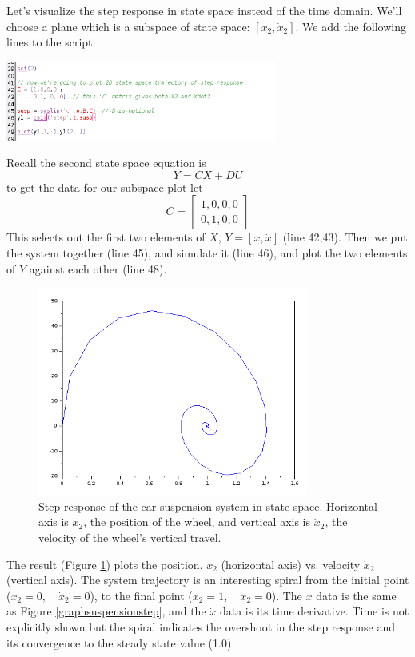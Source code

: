 Let's visualize the step response in state space instead of the time domain.   We'll choose 
a plane which is a subspace of state space: $[x_2, \dot{x}_2]$.   We add the following lines
to the script:

\begin{center}
\includegraphics[width=3.5in]{figs04/ss_xyplot.png}
\end{center}

Recall the second state space equation is 
\[
Y = CX+DU
\]
to get the data for our subspace plot let 
\[
C = \begin{bmatrix} 1,0,0,0 \\ 0,1,0,0 \end{bmatrix}
\]
This selects out the first two elements of $X$, $Y=[x, \dot{x}]$ (line 42,43).  Then we put the system
together (line 45), and simulate it (line 46), and plot the two elements of $Y$ against each other (line 48).

\begin{figure}\centering
\includegraphics[width=3.5in]{figs04/ss_spiral_response.png}
\caption{Step response of the car suspension system in state space.  Horizontal axis is $x_2$, the position of the wheel, and vertical axis is $\dot{x}_2$, the velocity of the wheel's vertical travel.}\label{graphstatespacespiral}
\end{figure}

The result (Figure \ref{graphstatespacespiral}) plots the position, $x_2$ (horizontal axis) vs. velocity 
$\dot{x}_2$ (vertical axis).  The system trajectory is an interesting spiral from the initial point
($x_2=0, \quad \dot{x}_2=0$), to the final point ($x_2=1, \quad\dot{x}_2=0$).   The $x$ data is the same
as Figure \ref{graphsuspensionstep}, and the $\dot{x}$ data is its time derivative.  Time is not explicitly shown but the spiral indicates the overshoot in the step response and its convergence to the steady state 
value (1.0). 


